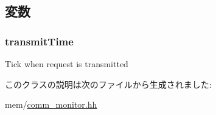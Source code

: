 \subsection{変数}
\hypertarget{classCommMonitor_1_1CommMonitorSenderState_ab7077cb90afe42deef3ee128e127d636}{
\subsubsection[{transmitTime}]{ {\bf transmitTime}}}
\label{classCommMonitor_1_1CommMonitorSenderState_ab7077cb90afe42deef3ee128e127d636}
Tick when request is transmitted 

このクラスの説明は次のファイルから生成されました:\begin{DoxyCompactItemize}
\item 
mem/\hyperlink{comm__monitor_8hh}{comm\_\-monitor.hh}\end{DoxyCompactItemize}
